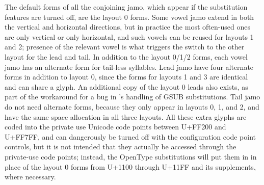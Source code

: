 \documentclass[14pt]{extarticle}
\begin{document}
{\hspace*{\fill}\hspace*{\fill}\par}

The default forms of all the conjoining jamo, which appear if the
substitution features are turned off, are the layout 0 forms.  Some vowel
jamo extend in both the vertical and horizontal directions, but in practice
the most often-used ones are only vertical or only horizontal, and such
vowels can be reused for layouts 1 and 2; presence of the relevant vowel is
what triggers the switch to the other layout for the lead and tail.  In
addition to the layout 0/1/2 forms, each vowel jamo has an alternate form
for tail-less syllables.  Lead jamo have four alternate forms in addition to
layout 0, since the forms for layouts 1 and 3 are identical and can share a
glyph.  An additional copy of the layout 0 leads also exists, as part of the
workaround for a bug in \XeTeX's handling of GSUB substitutions.  Tail jamo
do not need alternate forms, because they only appear in layouts 0, 1, and
2, and have the same space allocation in all three layouts.  All these extra
glyphs are coded into the private use Unicode code points between U+FF200
and U+FF7FF, and can dangerously be turned off with the configuration code
point controls, but it is not intended that they actually be accessed
through the private-use code points; instead, the OpenType substitutions
will put them in in place of the layout 0 forms from U+1100 through U+11FF
and its supplements, where necessary.
\end{document}
